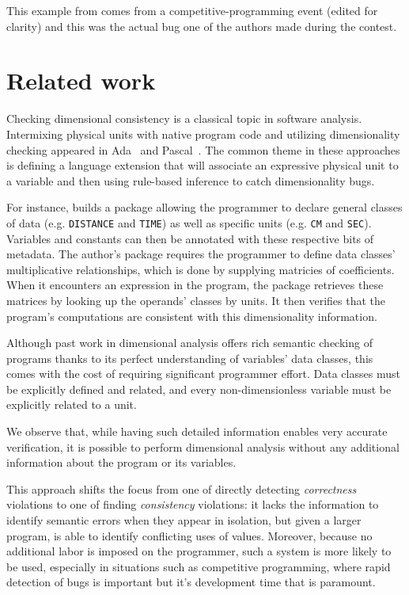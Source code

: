 \documentclass[12pt]{article}
\begin{document}
This example from  comes from a competitive-programming event (edited for clarity) and this was the actual bug one of the authors made during the contest. %

\section{Related work}

Checking dimensional consistency is a classical topic in software analysis.
Intermixing physical units with native program code and utilizing dimensionality checking appeared in Ada~\cite{hilfinger1988ada} and Pascal~\cite{dreiheller1986programming, gehani1977units}.
The common theme in these approaches is defining a language extension that will associate an expressive physical unit to a variable and then using rule-based inference to catch dimensionality bugs. 

For instance, \cite{hilfinger1988ada} builds a package allowing the programmer to declare general classes of data (e.g. \texttt{DISTANCE} and \texttt{TIME}) as well as specific units (e.g. \texttt{CM} and \texttt{SEC}).
Variables and constants can then be annotated with these respective bits of metadata.
The author's package requires the programmer to define data classes' multiplicative relationships, which is done by supplying matricies of coefficients.
When it encounters an expression in the program, the package retrieves these matrices by looking up the operands' classes by units.
It then verifies that the program's computations are consistent with this dimensionality information.

Although past work in dimensional analysis offers rich semantic checking of programs thanks to its perfect understanding of variables' data classes, this comes with the cost of requiring significant programmer effort.
Data classes must be explicitly defined and related, and every non-dimensionless variable must be explicitly related to a unit.

We observe that, while having such detailed information enables very accurate verification, it is possible to perform dimensional analysis without any additional information about the program or its variables.

This approach shifts the focus from one of directly detecting \textit{correctness} violations to one of finding \textit{consistency} violations: it lacks the information to identify semantic errors when they appear in isolation, but given a larger program, is able to identify conflicting uses of values.
Moreover, because no additional labor is imposed on the programmer, such a system is more likely to be used, especially in situations such as competitive programming, where rapid detection of bugs is important but it's development time that is paramount.
\end{document}
